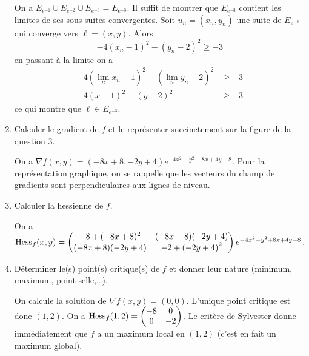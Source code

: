 \documentclass{tp_um}
\begin{document}
\begin{enumerate}
\begin{center}
		\end{center}


		On a $E_{e^{-1}} \cup E_{e^{-2}} \cup E_{e^{-3}} =E_{e^{-3}}$. Il suffit de montrer que  $E_{e^{-3}}$ contient les limites de ses sous suites convergentes. Soit $u_n = (x_n,y_n)$ une suite de $E_{e^{-3}}$ qui converge vers $\ell = (x,y)$. Alors 
		\[
			-4( x_n -1)^2 - (y_n -2)^2 \geq -3 
		\]
en passant à la limite on a 
\begin{align*}
			-4( \lim_n x_n -1)^2 - ( \lim_n y_n -2)^2 & \geq -3  \\
			-4( x -1)^2 - ( y -2)^2 & \geq -3 
\end{align*}
ce qui montre que $\ell \in E_{e^{-3}}$.


	\item Calculer le gradient de $f$ et le représenter succinctement sur la figure de la question 3.
		\bigskip
	
		On a $\nabla f (x,y) = ( -8x+ 8 , - 2y +4 ) e^{ -4x^2 - y^2 + 8x +4y -8 } $. Pour la représentation graphique, on se rappelle que les vecteurs du champ de gradients sont perpendiculaires aux lignes de niveau.   
	
		\bigskip


	\item Calculer la hessienne de $f$.
		\bigskip


		On a $\operatorname{Hess}_f (x,y) = \begin{pmatrix}
			-8 + (-8x+8)^2 & (-8x+8 )(-2y+4) \\(-8x+8 )(-2y+4)  & -2 +\left(-2y +4 \right)^2 
		\end{pmatrix} e^{ -4x^2 - y^2 + 8x +4y -8 } $. 

	\item Déterminer le(s) point(s) critique(s) de $f$ et donner leur nature (minimum, maximum, point selle,\ldots).
	
		On calcule la solution de $\nabla f(x,y) = (0,0)$. L'unique point critique est donc $(1,2)$. On a $\operatorname{Hess}_f(1,2) = \begin{pmatrix}
		-8 & 0 \\ 0 & -2	
		\end{pmatrix}$. Le critère de Sylvester donne immédiatement que $f$ a un maximum local en $(1,2)$ (c'est en fait un maximum global).



\end{enumerate}
\end{document}
